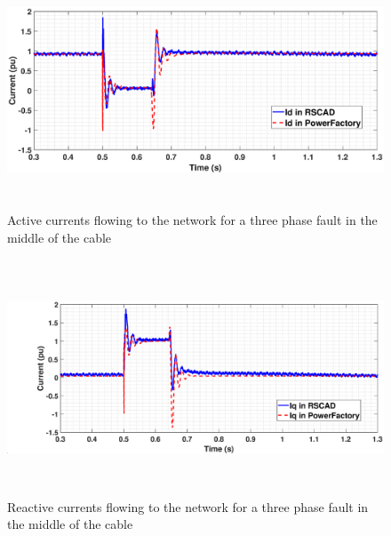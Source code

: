 \begin{figure}[H]
    \includegraphics[height = 7cm,width = \textwidth]{Diagrams/Chapter_3/ID_RSCAD_PFD_Comp.eps}
    \caption{Active currents flowing to the network for a three phase fault in the middle of the cable}
    \label{fig:ID_fullACSource}
\end{figure}
\vspace{-10mm}
\begin{figure}[H]
    \includegraphics[height = 7cm,width = \textwidth]{Diagrams/Chapter_3/IQ_RSCAD_PFD_Comp.eps}
    \caption{Reactive currents flowing to the network for a three phase fault in the middle of the cable}
    \label{fig:IQ_fullACSource}
\end{figure}